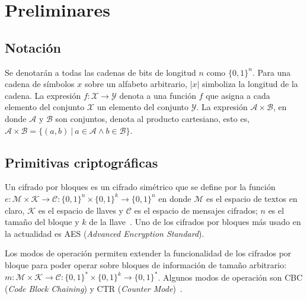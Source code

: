 %
%

\section{Preliminares}
\label{sec:preliminares}

\subsection{Notación}

Se denotarán a todas las cadenas de bits de longitud $ n $ como $ \{ 0, 1 \}^n $.
Para una cadena de símbolos $ x $ sobre un alfabeto arbitrario, $ | x | $
simboliza la longitud de la cadena. La expresión $ f: \mathcal{X} \rightarrow
\mathcal{Y} $ denota a una función $ f $ que asigna a cada elemento del conjunto
$ \mathcal{X} $ un elemento del conjunto $ \mathcal{Y} $. La expresión $
\mathcal{A} \times \mathcal{B} $, en donde $ \mathcal{A} $ y $ \mathcal{B} $ son
conjuntos, denota al producto cartesiano, esto es, $ \mathcal{A} \times
\mathcal{B} = \{ (a,b) \ | \ a \in \mathcal{A} \land b \in \mathcal{B} \} $.

\subsection{Primitivas criptográficas}

Un cifrado por bloques es un cifrado simétrico que se define por la función $ e:
\mathcal{M} \times \mathcal{K} \rightarrow \mathcal{C} : \{ 0, 1 \}^n \times \{
0, 1 \}^k \rightarrow \{ 0, 1 \}^n $ en donde $ \mathcal{M} $ es el espacio de
textos en claro, $ \mathcal{K} $ es el espacio de llaves y $ \mathcal{C} $ es el
espacio de mensajes cifrados; $ n $ es el tamaño del bloque y $ k $ de la
llave~\cite{menezes}. Uno de los cifrados por bloques más usado en la actualidad
es AES (\textit{Advanced Encryption Standard}).

Los modos de operación permiten extender la funcionalidad de los cifrados por
bloque para poder operar sobre bloques de información de tamaño arbitrario: $ m:
\mathcal{M} \times \mathcal{K} \rightarrow \mathcal{C} : \{ 0, 1 \}^* \times \{
0, 1 \}^k \rightarrow \{ 0, 1 \}^* $. Algunos modos de operación son CBC
(\textit{Code Block Chaining}) y CTR (\textit{Counter
Mode})~\cite{modos_de_operacion}.


